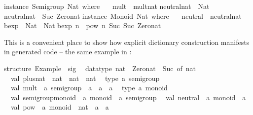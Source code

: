 \begin{isabellebody}
\begin{isamarkuptext}
\isanewline
instance\ Semigroup\ Nat\ where\ {\isacharbraceleft}\isanewline
\ \ mult\ {\isacharequal}\ mult{\isacharunderscore}nat{\isacharsemicolon}\isanewline
{\isacharbraceright}{\isacharsemicolon}\isanewline
\isanewline
neutral{\isacharunderscore}nat\ {\isacharcolon}{\isacharcolon}\ Nat{\isacharsemicolon}\isanewline
neutral{\isacharunderscore}nat\ {\isacharequal}\ Suc\ Zero{\isacharunderscore}nat{\isacharsemicolon}\isanewline
\isanewline
instance\ Monoid\ Nat\ where\ {\isacharbraceleft}\isanewline
\ \ neutral\ {\isacharequal}\ neutral{\isacharunderscore}nat{\isacharsemicolon}\isanewline
{\isacharbraceright}{\isacharsemicolon}\isanewline
\isanewline
bexp\ {\isacharcolon}{\isacharcolon}\ Nat\ {\isacharminus}{\isachargreater}\ Nat{\isacharsemicolon}\isanewline
bexp\ n\ {\isacharequal}\ pow\ n\ {\isacharparenleft}Suc\ {\isacharparenleft}Suc\ Zero{\isacharunderscore}nat{\isacharparenright}{\isacharparenright}{\isacharsemicolon}\isanewline
\isanewline
{\isacharbraceright}\isanewline%
\end{isamarkuptext}%
\isamarkuptrue%
%
\endisatagquotetypewriter
{\isafoldquotetypewriter}%
%
\isadelimquotetypewriter
%
\endisadelimquotetypewriter
%
\begin{isamarkuptext}%
\noindent This is a convenient place to show how explicit dictionary
  construction manifests in generated code -- the same example in
  :%
\end{isamarkuptext}%
\isamarkuptrue%
%
\isadelimquotetypewriter
%
\endisadelimquotetypewriter
%
\isatagquotetypewriter
%
\begin{isamarkuptext}%
structure\ Example\ {\isacharcolon}\ sig\isanewline
\ \ datatype\ nat\ {\isacharequal}\ Zero{\isacharunderscore}nat\ {\isacharbar}\ Suc\ of\ nat\isanewline
\ \ val\ plus{\isacharunderscore}nat\ {\isacharcolon}\ nat\ {\isacharminus}{\isachargreater}\ nat\ {\isacharminus}{\isachargreater}\ nat\isanewline
\ \ type\ {\isacharprime}a\ semigroup\isanewline
\ \ val\ mult\ {\isacharcolon}\ {\isacharprime}a\ semigroup\ {\isacharminus}{\isachargreater}\ {\isacharprime}a\ {\isacharminus}{\isachargreater}\ {\isacharprime}a\ {\isacharminus}{\isachargreater}\ {\isacharprime}a\isanewline
\ \ type\ {\isacharprime}a\ monoid\isanewline
\ \ val\ semigroup{\isacharunderscore}monoid\ {\isacharcolon}\ {\isacharprime}a\ monoid\ {\isacharminus}{\isachargreater}\ {\isacharprime}a\ semigroup\isanewline
\ \ val\ neutral\ {\isacharcolon}\ {\isacharprime}a\ monoid\ {\isacharminus}{\isachargreater}\ {\isacharprime}a\isanewline
\ \ val\ pow\ {\isacharcolon}\ {\isacharprime}a\ monoid\ {\isacharminus}{\isachargreater}\ nat\ {\isacharminus}{\isachargreater}\ {\isacharprime}a\ {\isacharminus}{\isachargreater}\ {\isacharprime}a\isanewline

\end{isamarkuptext}
\end{isabellebody}
